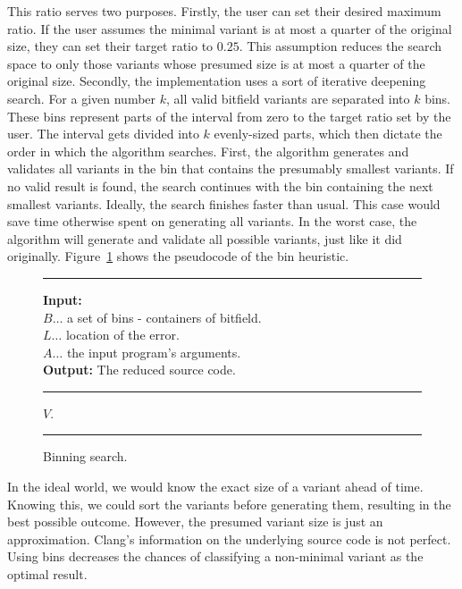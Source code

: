 This ratio serves two purposes. 
Firstly, the user can set their desired maximum ratio. 
If the user assumes the minimal variant is at most a quarter of 
the original size, they can set their target ratio to $0.25$. 
This assumption reduces the search space to only those variants whose 
presumed size is at most a quarter of the original size. 
Secondly, the implementation uses a sort of iterative deepening search. 
For a given number $k$, all valid bitfield variants are separated into $k$ 
bins. 
These bins represent parts of the interval from zero to the target ratio 
set by the user. 
The interval gets divided into $k$ evenly-sized parts, which then dictate 
the order in which the algorithm searches. 
First, the algorithm generates and validates all variants in the bin that 
contains the presumably smallest variants. 
If no valid result is found, the search continues with the bin containing 
the next smallest variants. 
Ideally, the search finishes faster than usual. 
This case would save time otherwise spent on generating all variants. 
In the worst case, the algorithm will generate and validate all possible 
variants, just like it did originally. 
Figure~\ref{alg:bins} shows the pseudocode of the bin heuristic.

\begin{figure}[h]
	\hrule height.8pt depth0pt \kern2pt
	\textbf{Input:} \\
	\hspace*{\algorithmicindent} $B \ldots$ a set of bins - containers of bitfield. \\
	\hspace*{\algorithmicindent} $L \ldots$ location of the error. \\
	\hspace*{\algorithmicindent} $A \ldots$ the input program's arguments. \\
	\textbf{Output:} The reduced source code. 
	\hrule height.8pt depth0pt \kern2pt
	\begin{algorithmic}[1]
					\Return $V$.
				\EndIf
			\EndFor
		\EndFor
	\end{algorithmic} 
	\hrule height.8pt depth0pt \kern2pt
	\caption{Binning search.} 
	\label{alg:bins}
\end{figure}

In the ideal world, we would know the exact size of a variant ahead of time. 
Knowing this, we could sort the variants before generating them, resulting 
in the best possible outcome. 
However, the presumed variant size is just an approximation. 
Clang's information on the underlying source code is not perfect. 
Using bins decreases the chances of classifying a non-minimal variant as 
the optimal result.

